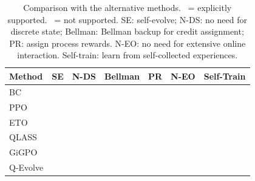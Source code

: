 \documentclass{article}
\newcommand{\cmark}{\textcolor{green!60!black}{\ding{51}}} %
\newcommand{\xmark}{\textcolor{red!70!black}{\ding{55}}}   %
\theoremstyle{plain}
\theoremstyle{definition}
\theoremstyle{remark}
\begin{document}
\begin{table}[t]
\centering
\setlength{\tabcolsep}{3.5pt} 
\small
\caption{Comparison with the alternative methods. \cmark~= explicitly supported. \xmark~= not supported. SE: self-evolve; N-DS: no need for discrete state; Bellman: Bellman backup for credit assignment; PR: assign process rewards. N-EO: no need for extensive online interaction. Self-train: learn from self-collected experiences.}
\label{tab:method_comparison}
\begin{tabular}{lcccccc}
\toprule
{Method} & {SE} & {N-DS} & {Bellman} & {PR} & {N-EO} & {Self-Train} \\
\midrule
BC & \xmark & \cmark  & \xmark &  \xmark&   \cmark&  \xmark \\
PPO &  \xmark  & \cmark  & \cmark  & \xmark  &   \xmark& \cmark\\
ETO &\xmark & \cmark & \xmark &\xmark  & \cmark& \cmark \\
QLASS & \xmark &\xmark  & \cmark  & \cmark  &   \xmark&\cmark\\
GiGPO & \xmark &  \xmark& \xmark& \cmark  &   \xmark& \cmark \\
\hline
Q-Evolve & \cmark & \cmark & \cmark  &\cmark  & \cmark &\cmark \\
\bottomrule
\end{tabular}
\end{table}
\end{document}

